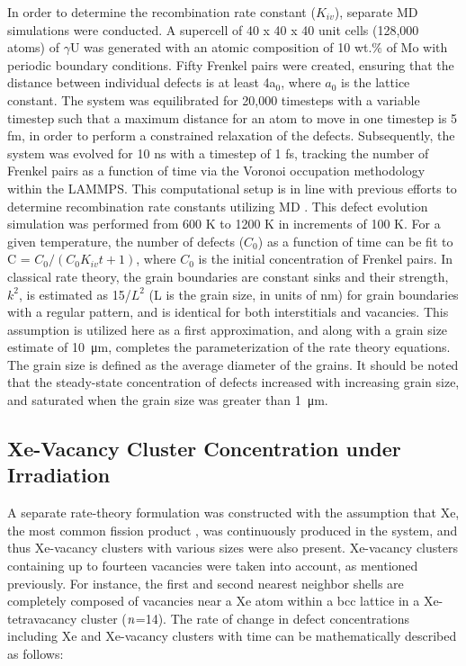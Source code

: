 \documentclass[preprint,12pt]{elsarticle}
\providecommand{\DIFadd}[1]{{\protect\color{blue} \sf #1}} %
\providecommand{\DIFaddbegin}{} %
\providecommand{\DIFaddend}{} %
\newcommand{\DIFaddincludegraphics}[2][]{{\color{blue}\fbox{\DIFOincludegraphics[#1]{#2}}}} %
\DeclareRobustCommand{\DIFaddbegin}{\DIFOaddbegin \let\includegraphics\DIFaddincludegraphics} %
\DeclareRobustCommand{\DIFaddend}{\DIFOaddend \let\includegraphics\DIFOincludegraphics} %
\begin{document}
\indent In order to determine the recombination rate constant ($K_{iv}$), separate MD simulations were conducted. A supercell of 40 x 40 x 40 unit cells (128,000 atoms) of $\gamma$U was generated with an atomic composition of 10 wt.$\%$ of Mo with periodic boundary conditions. Fifty Frenkel pairs were created, ensuring that the distance between individual defects is at least 4a$_{0}$, where $a_{0}$ is the lattice constant. The system was equilibrated for 20,000 timesteps with a variable timestep such that a maximum distance for an atom to move in one timestep is 5 fm, in order to perform a constrained relaxation of the defects. Subsequently, the system was evolved for 10 ns with a timestep of 1 fs, tracking the number of Frenkel pairs as a function of time via the Voronoi occupation methodology within the LAMMPS. This computational setup is in line with previous efforts to determine recombination rate constants utilizing MD \cite{zhang2012atomistic}. This defect evolution simulation was performed from 600 K to 1200 K in increments of 100 K. For a given temperature, the number of defects ($C_{0}$) as a function of time can be fit to C = $C_{0}/(C_{0}K_{iv}t +1)$, where $C_{0}$ is the initial concentration of Frenkel pairs. In classical rate theory, the grain boundaries are constant sinks and their strength, $k^{2}$, is estimated as 15/$L^{2}$ (L is the grain size, in units of nm) for grain boundaries with a regular pattern, and is identical for both interstitials and vacancies. This assumption is utilized here as a first approximation, and along with a grain size estimate of \SI{10}{\micro\metre}, completes the parameterization of the rate theory equations. The grain size is defined as the average diameter of the grains. It should be noted that the steady-state concentration of defects increased with increasing grain size, and saturated when the grain size was greater than \SI{1}{\micro\metre}. \\
\DIFaddbegin 

\subsection{\DIFadd{Xe-Vacancy Cluster Concentration under Irradiation}}

\DIFaddend \indent A separate rate-theory formulation was constructed with the assumption that Xe, the most common fission product \cite{kleykamp1985chemical}, was continuously produced in the system, and thus Xe-vacancy clusters with various sizes were also present. Xe-vacancy clusters containing up to fourteen vacancies were taken into account, as mentioned previously. For instance, the first and second nearest neighbor shells are completely composed of vacancies near a Xe atom within a bcc lattice in a Xe-tetravacancy cluster ($\it{n}$=14). The rate of change in defect concentrations including Xe and Xe-vacancy clusters with time can be mathematically described as follows:
\end{document}
